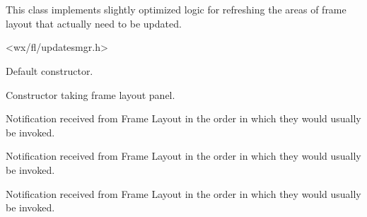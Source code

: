 %
%


\section{}\label{cbsimpleupdatesmgr}


This class implements slightly optimized logic for refreshing
the areas of frame layout that actually need to be updated.




<wx/fl/updatesmgr.h>




\label{cbsimpleupdatesmgrcbsimpleupdatesmgr}


Default constructor.



Constructor taking frame layout panel.


\label{cbsimpleupdatesmgronbarwillchange}


Notification received from Frame Layout in the order in which
they would usually be invoked.


\label{cbsimpleupdatesmgronfinishchanges}


Notification received from Frame Layout in the order in which
they would usually be invoked.


\label{cbsimpleupdatesmgronpanemarginswillchange}


Notification received from Frame Layout in the order in which
they would usually be invoked.


